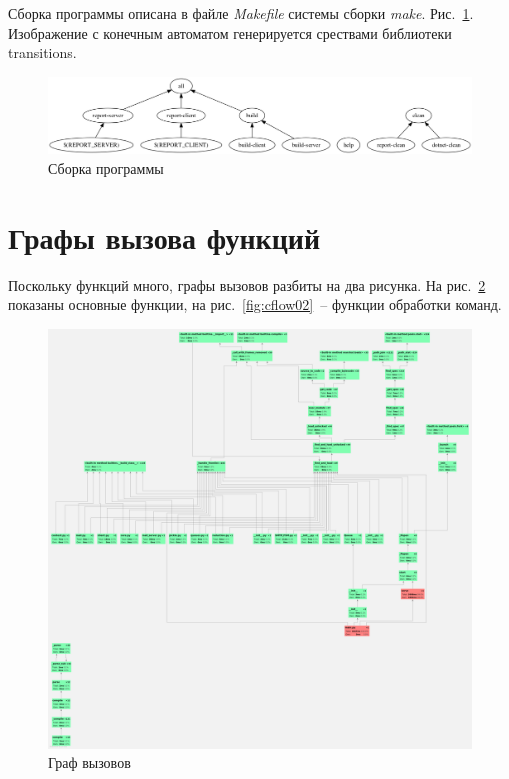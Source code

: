 \documentclass[a4paper,12pt]{report}
\begin{document}
Сборка программы описана в файле \textit{Makefile} системы сборки \textit{make}. Рис.~\ref{fig:make}. Изображение с конечным автоматом генерируется срествами библиотеки transitions.

\begin{figure}
\centering
\includegraphics[width=\textwidth]{include/make.png}
\caption{Сборка программы}
\label{fig:make}
\end{figure}

\section{Графы вызова функций}

Поскольку функций много, графы вызовов разбиты на два рисунка. На рис.~\ref{fig:cflow01} показаны основные функции, на рис.~\ref{fig:cflow02}~-- функции обработки команд. 

\begin{figure}
\centering
\includegraphics[width=\textwidth]{static/smtp-course-work14.png}
\caption{Граф вызовов}
\label{fig:cflow01}
\end{figure}
\end{document}
